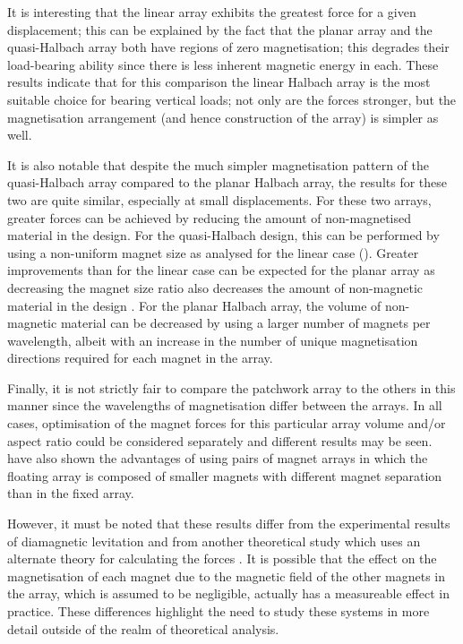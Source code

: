 \documentclass[11pt,a4paper]{memoir}
\begin{document}
It is interesting that the linear array exhibits the greatest force for a given displacement; this can be explained by the fact that the planar array and the quasi-Halbach array both have regions of zero magnetisation; this degrades their load-bearing ability since there is less inherent magnetic energy in each.
These results indicate that for this comparison the linear Halbach array is the most suitable choice for bearing vertical loads; not only are the forces stronger, but the magnetisation arrangement (and hence construction of the array) is simpler as well.

It is also notable that despite the much simpler magnetisation pattern of the quasi-Halbach array compared to the planar Halbach array, the results for these two are quite similar, especially at small displacements.
For these two arrays, greater forces can be achieved by reducing the amount of non-magnetised material in the design.
For the quasi-Halbach design, this can be performed by using a non-uniform magnet size as analysed for the linear case ().
Greater improvements than for the linear case can be expected for the planar array as decreasing the magnet size ratio also decreases the amount of non-magnetic material in the design \cite{rovers2009-ietm,janssen2009-jsdd}.
For the planar Halbach array, the volume of non-magnetic material can be decreased by using a larger number of magnets per wavelength, albeit with an increase in the number of unique magnetisation directions required for each magnet in the array.

Finally, it is not strictly fair to compare the patchwork array to the others in this manner since the wavelengths of magnetisation differ between the arrays.
In all cases, optimisation of the magnet forces for this particular array volume and/or aspect ratio could be considered separately and different results may be seen.
\textcite{janssen2012-pier} have also shown the advantages of using pairs of magnet arrays in which the floating array is composed of smaller magnets with different magnet separation than in the fixed array.

However, it must be noted that these results differ from the experimental results of diamagnetic levitation \cite{moser2002-maglev} and from another theoretical study which uses an alternate theory for calculating the forces \cite{campbell2002}.
It is possible that the effect on the magnetisation of each magnet due to the magnetic field of the other magnets in the array, which is assumed to be negligible, actually has a measureable effect in practice.
These differences highlight the need to study these systems in more detail outside of the realm of theoretical analysis.
\end{document}
